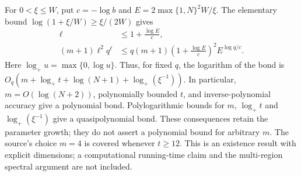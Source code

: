 For $0<\xi\leq W$, put $c=-\log b$ and
$E=2\max\{1,N\}^2W/\xi$. The elementary bound
$\log(1+\xi/W)\geq\xi/(2W)$ gives
\begin{align}
    \ell & \leq1+\frac{\log E}{c},                      \\
    (m+1)\ell^2q^\ell
         & \leq q(m+1)\left(1+\frac{\log E}{c}\right)^2
    E^{\log q/c}.
\end{align}
Here $\log_+u=\max\{0,\log u\}$. Thus, for fixed $q$, the logarithm of the bond is
$O_q(m+\log_+t+\log(N+1)+\log_+(\xi^{-1}))$.
In particular, $m=O(\log(N+2))$, polynomially bounded $t$, and
inverse-polynomial accuracy give a polynomial bond. Polylogarithmic
bounds for $m$, $\log_+t$ and $\log_+(\xi^{-1})$ give a
quasipolynomial bond. These consequences retain the parameter growth;
they do not assert a polynomial bound for arbitrary $m$.
The source's choice $m=4$ is covered whenever $t\geq12$.
This is an existence result with explicit dimensions; a computational
running-time claim and the multi-region spectral argument are not included.

